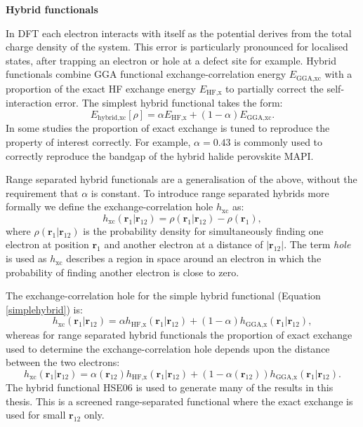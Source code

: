\textbf{Hybrid functionals} 

In DFT each electron interacts with itself as the potential derives from the total charge density of the system. This error is particularly pronounced for localised states, after trapping an electron or hole at a defect site for example. Hybrid functionals combine GGA functional exchange-correlation energy $E_{\textrm{GGA,xc}}$ with a proportion of the exact HF exchange energy $E_{\textrm{HF,x}}$ to partially correct the self-interaction error. The simplest hybrid functional takes the form:\autocite{Henderson2008}
\begin{equation} \label{simplehybrid}
E_{\textrm{hybrid,xc}}\left[\rho\right] = \alpha E_{\textrm{HF,x}} + \left(1-\alpha\right)E_{\textrm{GGA,xc}}.
\end{equation}
In some studies the proportion of exact exchange is tuned to reproduce the property of interest correctly. For example, $\alpha=0.43$ is commonly used to correctly reproduce the bandgap of the hybrid halide perovskite MAPI.\autocite{Whalley2017} %

Range separated hybrid functionals are a generalisation of the above, without the requirement that $\alpha$ is constant.
To introduce range separated hybrids more formally we define the exchange-correlation hole $h_\mathrm{xc}$ as:
\begin{equation}
h_\mathrm{xc}(\mathbf{r}_1|\mathbf{r}_{12}) = \rho(\mathbf{r}_1|\mathbf{r}_{12})-\rho(\mathbf{r}_1),
\end{equation}
where $\rho(\mathbf{r}_1|\mathbf{r}_{12})$ is the probability density for simultaneously finding one electron at position $\mathbf{r}_1$ and another electron at a distance of $|\mathbf{r}_{12}|$.
The term \textit{hole} is used as $h_\mathrm{xc}$ describes a region in space around an electron in which the probability of finding another electron is close to zero.

The exchange-correlation hole for the simple hybrid functional (Equation \ref{simplehybrid}) is:\autocite{Henderson2008}
\begin{equation}
h_\mathrm{xc}(\mathbf{r}_1|\mathbf{r}_{12}) = \alpha h_{\textrm{HF,x}}(\mathbf{r}_1|\mathbf{r}_{12})+ \left(1-\alpha\right)h_{\textrm{GGA,x}}(\mathbf{r}_1|\mathbf{r}_{12}),
\end{equation}
whereas for range separated hybrid functionals the proportion of exact exchange used to determine the exchange-correlation hole depends upon the distance between the two electrons:\autocite{Henderson2008}
\begin{equation}
h_\mathrm{xc}(\mathbf{r}_1|\mathbf{r}_{12}) = \alpha(\mathbf{r}_{12}) h_{\textrm{HF,x}}(\mathbf{r}_1|\mathbf{r}_{12})+ \left(1-\alpha(\mathbf{r}_{12})\right)h_{\textrm{GGA,x}}(\mathbf{r}_1|\mathbf{r}_{12}).
\end{equation}
The hybrid functional HSE06\autocite{Heyd2003} is used to generate many of the results in this thesis. This is a screened range-separated functional where the exact exchange is used for small $\mathbf{r}_{12}$ only. 

